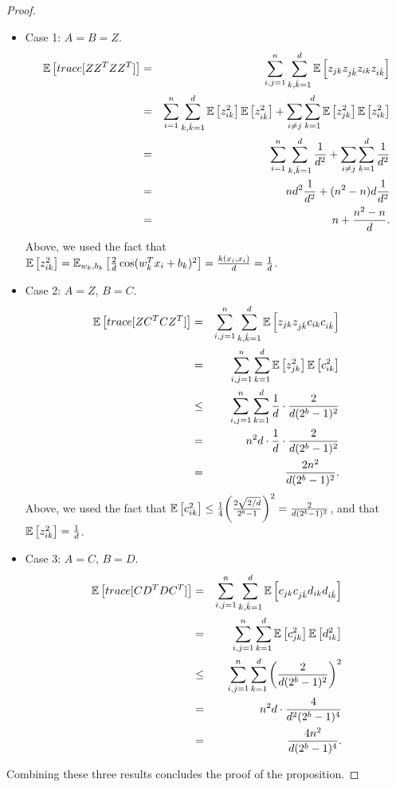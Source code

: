 \documentclass[12pt]{article}
\newcommand{\hk}{\hat{k}}
\begin{document}
\begin{proof}
\begin{itemize}
	\item Case 1: $A=B=Z$.
	\begin{eqnarray*}
		\expect{}{trace[ZZ^TZZ^T]} &=& \sum_{i,j=1}^n \sum_{k,\hk=1}^d \expect{}{z_{jk}z_{j\hk}z_{ik}z_{i\hk}}\\
		&=& \sum_{i=1}^n \sum_{k,\hk=1}^d \expect{}{z_{ik}^2}\expect{}{z_{i\hk}^2} + \sum_{i\neq j} \sum_{k=1}^d \expect{}{z_{jk}^2}\expect{}{z_{ik}^2}\\
		&=& \sum_{i=1}^n \sum_{k,\hk=1}^d \frac{1}{d^2} + \sum_{i\neq j} \sum_{k=1}^d \frac{1}{d^2}\\
		&=& nd^2\frac{1}{d^2} + (n^2-n)d\frac{1}{d^2}\\
		&=& n + \frac{n^2-n}{d}.
	\end{eqnarray*}
	Above, we used the fact that $\expect{}{z_{ik}^2} = \expect{w_k,b_k}{\frac{2}{d}\cos(w_k^T x_i + b_k)^2} = \frac{k(x_i,x_i)}{d} = \frac{1}{d}$.
	\item Case 2: $A=Z$, $B=C$.
	\begin{eqnarray*}
		\expect{}{trace[ZC^TCZ^T]} &=& \sum_{i,j=1}^n \sum_{k,\hk=1}^d \expect{}{z_{jk}z_{j\hk}c_{ik}c_{i\hk}}\\	
		&=& \sum_{i,j=1}^n \sum_{k=1}^d \expect{}{z_{jk}^2}\expect{}{c_{ik}^2}\\	
		&\leq& \sum_{i,j=1}^n \sum_{k=1}^d \frac{1}{d}\cdot \frac{2}{d(2^b-1)^2}\\	
		&=& n^2d \cdot \frac{1}{d}\cdot \frac{2}{d(2^b-1)^2}\\	
		&=& \frac{2n^2}{d(2^b-1)^2}.
	\end{eqnarray*}
	Above, we used the fact that $\expect{}{c_{ik}^2} \leq \frac{1}{4}\bigg(\frac{2\sqrt{2/d}}{2^b-1}\bigg)^2 = \frac{2}{d(2^b-1)^2}$, and that $\expect{}{z_{ik}^2} = \frac{1}{d}$.
	\item Case 3: $A=C$, $B=D$.
	\begin{eqnarray*}
		\expect{}{trace[CD^TDC^T]} &=& \sum_{i,j=1}^n \sum_{k,\hk=1}^d \expect{}{c_{jk}c_{j\hk}d_{ik}d_{i\hk}}\\
		&=& \sum_{i,j=1}^n \sum_{k=1}^d \expect{}{c_{jk}^2}\expect{}{d_{ik}^2}\\
		&\leq& \sum_{i,j=1}^n \sum_{k=1}^d \bigg(\frac{2}{d(2^b-1)^2}\bigg)^2\\
		&=& n^2d \cdot\frac{4}{d^2(2^b-1)^4}\\
		&=& \frac{4n^2}{d(2^b-1)^4}.
	\end{eqnarray*}
\end{itemize}
Combining these three results concludes the proof of the proposition.
\end{proof}
\end{document}
